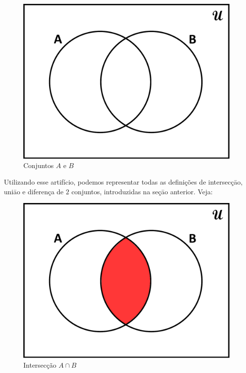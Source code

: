 \begin{figure}[ht!]
  \centering
  \includegraphics[scale=0.29]{figures/sets/fig_sets_03_04.pdf}
  \caption{Conjuntos $A$ e $B$}
  \label{fig:sets_03_04}
\end{figure}

Utilizando esse artifício, podemos representar todas as definições de intersecçāo, uniāo e diferença de $2$ conjuntos, introduzidas na seçāo anterior. Veja:

\begin{figure}[h!]
  \centering
  \includegraphics[scale=0.29]{figures/sets/fig_sets_03_05.pdf}
  \caption{Intersecção $A \cap B$}
  \label{fig:sets_03_05}
\end{figure}

